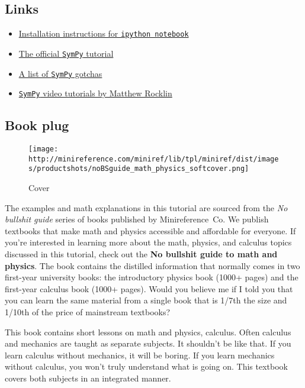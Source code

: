 \documentclass{article}
\begin{document}
    \subsection{Links}\label{links}

    \begin{itemize}
\itemsep1pt\parskip0pt
\item
  \href{http://ipython.org/install.html}{Installation instructions for
  \texttt{ipython notebook}}
\item
  \href{http://docs.sympy.org/latest/tutorial/intro.html}{The official
  \texttt{SymPy} tutorial}
\item
  \href{http://docs.sympy.org/dev/gotchas.html}{A list of \texttt{SymPy}
  gotchas}
\item
  \href{http://pyvideo.org/speaker/583/matthew-rocklin}{\texttt{SymPy}
  video tutorials by Matthew Rocklin}
\end{itemize}

    \subsection{Book plug}\label{book-plug}

    \begin{figure}[htbp]
\centering
\texttt{[image: http://minireference.com/miniref/lib/tpl/miniref/dist/images/productshots/noBSguide\_math\_physics\_softcover.png]}
\caption{Cover}
\end{figure}

The examples and math explanations in this tutorial are sourced from the
\emph{No bullshit guide} series of books published by Minireference~Co.
We publish textbooks that make math and physics accessible and
affordable for everyone. If you're interested in learning more about the
math, physics, and calculus topics discussed in this tutorial, check out
the \textbf{No bullshit guide to math and physics}. The book contains
the distilled information that normally comes in two first-year
university books: the introductory physics book (1000+ pages) and the
first-year calculus book (1000+ pages). Would you believe me if I told
you that you can learn the same material from a single book that is
1/7th the size and 1/10th of the price of mainstream textbooks?

This book contains short lessons on math and physics, calculus. Often
calculus and mechanics are taught as separate subjects. It shouldn't be
like that. If you learn calculus without mechanics, it will be boring.
If you learn mechanics without calculus, you won't truly understand what
is going on. This textbook covers both subjects in an integrated manner.
\end{document}
